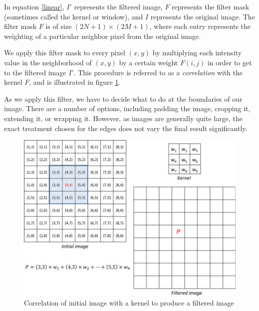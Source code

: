 \documentclass[twoside]{article}
\begin{document}
In equation \ref{linear}, $I'$ represents the filtered image, $F$ represents the filter mask (sometimes called the kernel or window), and $I$ represents the original image. The filter mask $F$ is of size $(2N + 1)\times(2M + 1)$, where each entry represents the weighting of a particular neighbor pixel from the original image.

We apply this filter mask to every pixel $(x,y)$ by multiplying each intensity value in the neighborhood of $(x,y)$ by a certain weight $F(i,j)$ in order to get to the filtered image $I'$. This procedure is referred to as a \textit{correlation} with the kernel $F$, and is illustrated in figure \ref{correlation}. 

As we apply this filter, we have to decide what to do at the boundaries of our image. There are a number of options, including padding the image, cropping it, extending it, or wrapping it. However, as images are generally quite large, the exact treatment chosen for the edges does not vary the final result significantly.

\begin{figure}[h]
  \centering
  \includegraphics[scale=.8]{filter.jpg}
    \caption{Correlation of initial image with a kernel to produce a filtered image}
    \label{correlation}
\end{figure}
\end{document}
